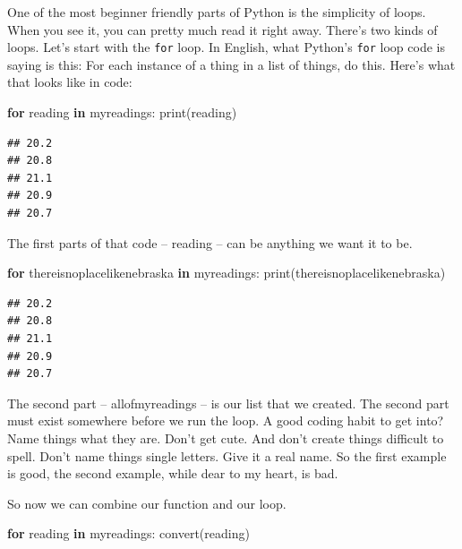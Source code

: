 \documentclass[
]{book}
\newenvironment{Shaded}{\begin{snugshade}}{\end{snugshade}}
\newcommand{\BuiltInTok}[1]{#1}
\newcommand{\ControlFlowTok}[1]{\textcolor[rgb]{0.13,0.29,0.53}{\textbf{#1}}}
\newcommand{\KeywordTok}[1]{\textcolor[rgb]{0.13,0.29,0.53}{\textbf{#1}}}
\newcommand{\NormalTok}[1]{#1}
\begin{document}
One of the most beginner friendly parts of Python is the simplicity of loops. When you see it, you can pretty much read it right away. There's two kinds of loops. Let's start with the \texttt{for} loop. In English, what Python's \texttt{for} loop code is saying is this: For each instance of a thing in a list of things, do this. Here's what that looks like in code:

\begin{Shaded}
\begin{Highlighting}[]
\ControlFlowTok{for}\NormalTok{ reading }\KeywordTok{in}\NormalTok{ myreadings:}
    \BuiltInTok{print}\NormalTok{(reading)}
\end{Highlighting}
\end{Shaded}

\begin{verbatim}
## 20.2
## 20.8
## 21.1
## 20.9
## 20.7
\end{verbatim}

The first parts of that code -- reading -- can be anything we want it to be.

\begin{Shaded}
\begin{Highlighting}[]
\ControlFlowTok{for}\NormalTok{ thereisnoplacelikenebraska }\KeywordTok{in}\NormalTok{ myreadings:}
    \BuiltInTok{print}\NormalTok{(thereisnoplacelikenebraska)}
\end{Highlighting}
\end{Shaded}

\begin{verbatim}
## 20.2
## 20.8
## 21.1
## 20.9
## 20.7
\end{verbatim}

The second part -- allofmyreadings -- is our list that we created. The second part must exist somewhere before we run the loop. A good coding habit to get into? Name things what they are. Don't get cute. And don't create things difficult to spell. Don't name things single letters. Give it a real name. So the first example is good, the second example, while dear to my heart, is bad.

So now we can combine our function and our loop.

\begin{Shaded}
\begin{Highlighting}[]
\ControlFlowTok{for}\NormalTok{ reading }\KeywordTok{in}\NormalTok{ myreadings:}
\NormalTok{    convert(reading)}
\end{Highlighting}
\end{Shaded}
\end{document}
